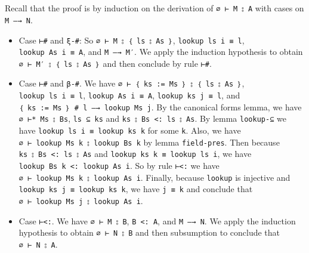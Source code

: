 \begin{fence}
\begin{code}
\AgdaSymbol{=}\AgdaSpace{}%
\AgdaSpace{}%
\AgdaSpace{}%
\AgdaSymbol{(}\AgdaSpace{}%
\AgdaSymbol{(}\AgdaSpace{}%
\AgdaSymbol{))}\AgdaSpace{}%
\<%
\\
%
\>[4]\<%
\\
\>[0]\AgdaSpace{}%
\AgdaSymbol{(}\AgdaSpace{}%
\AgdaSpace{}%
\AgdaSymbol{)}\AgdaSpace{}%
%
\>[50]\AgdaSymbol{=}%
\>[53]\AgdaSpace{}%
\AgdaSymbol{(}\AgdaSpace{}%
\AgdaSpace{}%
\AgdaSymbol{)}\AgdaSpace{}%
\<%
\end{code}
\end{fence}

Recall that the proof is by induction on the derivation of
\texttt{∅\ ⊢\ M\ ⦂\ A} with cases on \texttt{M\ —→\ N}.

\begin{itemize}
\item
  Case \texttt{⊢\#} and \texttt{ξ-\#}: So
  \texttt{∅\ ⊢\ M\ ⦂\ ｛\ ls\ ⦂\ As\ ｝}, \texttt{lookup\ ls\ i\ ≡\ l},
  \texttt{lookup\ As\ i\ ≡\ A}, and \texttt{M\ —→\ M′}. We apply the
  induction hypothesis to obtain \texttt{∅\ ⊢\ M′\ ⦂\ ｛\ ls\ ⦂\ As\ ｝}
  and then conclude by rule \texttt{⊢\#}.
\item
  Case \texttt{⊢\#} and \texttt{β-\#}. We have
  \texttt{∅\ ⊢\ ｛\ ks\ :=\ Ms\ ｝\ ⦂\ ｛\ ls\ ⦂\ As\ ｝},
  \texttt{lookup\ ls\ i\ ≡\ l}, \texttt{lookup\ As\ i\ ≡\ A},
  \texttt{lookup\ ks\ j\ ≡\ l}, and
  \texttt{｛\ ks\ :=\ Ms\ ｝\ \#\ l\ —→\ lookup\ Ms\ j}. By the
  canonical forms lemma, we have \texttt{∅\ ⊢*\ Ms\ ⦂\ Bs},
  \texttt{ls\ ⊆\ ks} and \texttt{ks\ ⦂\ Bs\ \textless{}:\ ls\ ⦂\ As}. By
  lemma \texttt{lookup-⊆} we have
  \texttt{lookup\ ls\ i\ ≡\ lookup\ ks\ k} for some \texttt{k}. Also, we
  have \texttt{∅\ ⊢\ lookup\ Ms\ k\ ⦂\ lookup\ Bs\ k} by lemma
  \texttt{field-pres}. Then because
  \texttt{ks\ ⦂\ Bs\ \textless{}:\ ls\ ⦂\ As} and
  \texttt{lookup\ ks\ k\ ≡\ lookup\ ls\ i}, we have
  \texttt{lookup\ Bs\ k\ \textless{}:\ lookup\ As\ i}. So by rule
  \texttt{⊢\textless{}:} we have
  \texttt{∅\ ⊢\ lookup\ Ms\ k\ ⦂\ lookup\ As\ i}. Finally, because
  \texttt{lookup} is injective and
  \texttt{lookup\ ks\ j\ ≡\ lookup\ ks\ k}, we have \texttt{j\ ≡\ k} and
  conclude that \texttt{∅\ ⊢\ lookup\ Ms\ j\ ⦂\ lookup\ As\ i}.
\item
  Case \texttt{⊢\textless{}:}. We have \texttt{∅\ ⊢\ M\ ⦂\ B},
  \texttt{B\ \textless{}:\ A}, and \texttt{M\ —→\ N}. We apply the
  induction hypothesis to obtain \texttt{∅\ ⊢\ N\ ⦂\ B} and then
  subsumption to conclude that \texttt{∅\ ⊢\ N\ ⦂\ A}.
\end{itemize}

